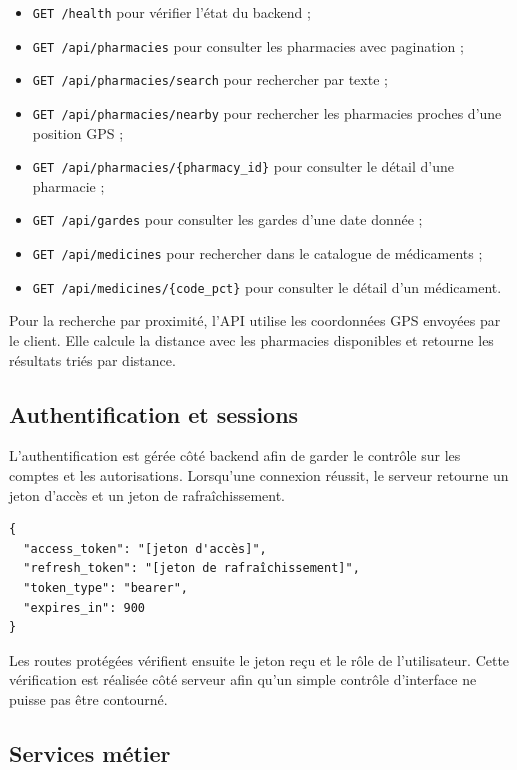 \begin{itemize}
    \item \texttt{GET /health} pour vérifier l'état du backend ;
    \item \texttt{GET /api/pharmacies} pour consulter les pharmacies avec pagination ;
    \item \texttt{GET /api/pharmacies/search} pour rechercher par texte ;
    \item \texttt{GET /api/pharmacies/nearby} pour rechercher les pharmacies proches d'une position GPS ;
    \item \texttt{GET /api/pharmacies/\{pharmacy\_id\}} pour consulter le détail d'une pharmacie ;
    \item \texttt{GET /api/gardes} pour consulter les gardes d'une date donnée ;
    \item \texttt{GET /api/medicines} pour rechercher dans le catalogue de médicaments ;
    \item \texttt{GET /api/medicines/\{code\_pct\}} pour consulter le détail d'un médicament.
\end{itemize}

Pour la recherche par proximité, l'API utilise les coordonnées GPS envoyées par le client. Elle calcule la
distance avec les pharmacies disponibles et retourne les résultats triés par distance.

\subsection{Authentification et sessions}

L'authentification est gérée côté backend afin de garder le contrôle sur les comptes et les autorisations.
Lorsqu'une connexion réussit, le serveur retourne un jeton d'accès et un jeton de rafraîchissement.

\begin{lstlisting}[caption={Structure simplifiée d'une réponse de connexion}]
{
  "access_token": "[jeton d'accès]",
  "refresh_token": "[jeton de rafraîchissement]",
  "token_type": "bearer",
  "expires_in": 900
}
\end{lstlisting}

Les routes protégées vérifient ensuite le jeton reçu et le rôle de l'utilisateur. Cette vérification est
réalisée côté serveur afin qu'un simple contrôle d'interface ne puisse pas être contourné.

\subsection{Services métier}


